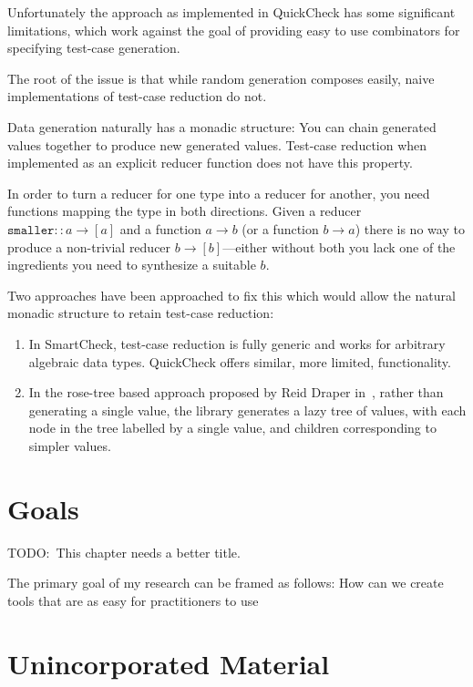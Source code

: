 Unfortunately the approach as implemented in QuickCheck has some significant limitations,
which work against the goal of providing easy to use combinators for specifying test-case generation.

The root of the issue is that while random generation composes easily,
naive implementations of test-case reduction do not.

Data generation naturally has a monadic structure:
You can chain generated values together to produce new generated values.
Test-case reduction when implemented as an explicit reducer function does not have this property.

In order to turn a reducer for one type into a reducer for another,
you need functions mapping the type in both directions.
Given a reducer \(\texttt{smaller} :: a \to [a]\) and a function \(a \to b\) (or a function \(b \to a\)) there is no way to produce a non-trivial reducer \(b \to [b]\)---either
without both you lack one of the ingredients you need to synthesize a suitable \(b\).

Two approaches have been approached to fix this which would allow the natural monadic structure to retain test-case reduction:

\begin{enumerate}
\item In SmartCheck\cite{DBLP:conf/haskell/Pike14},
test-case reduction is fully generic and works for arbitrary algebraic data types.
QuickCheck offers similar,
more limited,
functionality.
\item In the rose-tree based approach proposed by Reid Draper in~\cite{FreeShrinking},
rather than generating a single value,
the library generates a lazy tree of values,
with each node in the tree labelled by a single value,
and children corresponding to simpler values.
\end{enumerate}

\chapter{Goals}

TODO:\ This chapter needs a better title.

The primary goal of my research can be framed as follows:
How can we create tools that are as easy for practitioners to use 

\chapter{Unincorporated Material}

